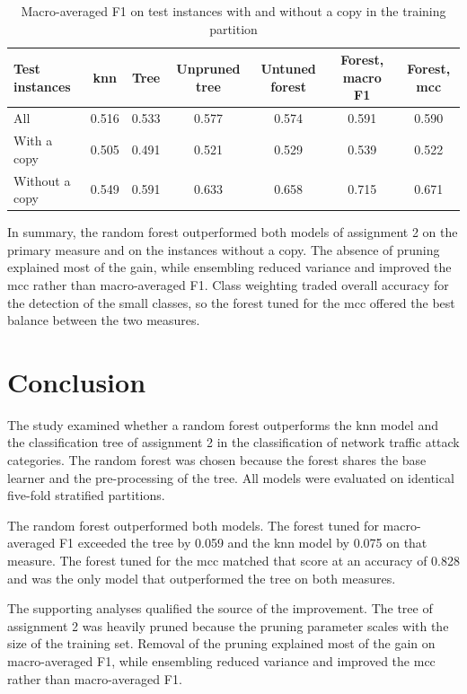 \documentclass[conference]{IEEEtran}
\begin{document}
\begin{table}[t]
\centering
\caption{Macro-averaged F1 on test instances with and without a copy in the training partition}
\label{tab:duplicates}
\small
\begin{tabular}{lcccccc}
\toprule
Test instances & \acrshort{knn} & Tree & Unpruned tree & Untuned forest & Forest, macro F1 & Forest, \acrshort{mcc} \\
\midrule
All & 0.516 & 0.533 & 0.577 & 0.574 & 0.591 & 0.590 \\
With a copy & 0.505 & 0.491 & 0.521 & 0.529 & 0.539 & 0.522 \\
Without a copy & 0.549 & 0.591 & 0.633 & 0.658 & 0.715 & 0.671 \\
\bottomrule
\end{tabular}
\end{table}

In summary, the random forest outperformed both models of assignment 2 on the
primary measure and on the instances without a copy. The
absence of pruning explained most of the gain, while ensembling reduced variance and
improved the \gls{mcc} rather than macro-averaged F1. Class weighting traded overall
accuracy for the detection of the small classes, so the forest tuned for the
\gls{mcc} offered the best balance between the two measures.

\section{Conclusion}
\glsresetall

The study examined whether a random forest outperforms the \gls{knn} model and the
classification tree of assignment 2 in the classification of network traffic attack
categories. The random forest was chosen because the forest shares the base learner
and the pre-processing of the tree. All models were evaluated on identical
five-fold stratified partitions.

The random forest outperformed both models. The forest tuned for macro-averaged F1
exceeded the tree by 0.059 and the \gls{knn} model by 0.075 on that measure. The
forest tuned for the \gls{mcc} matched that score at an accuracy of 0.828 and was the
only model that outperformed the tree on both measures.

The supporting analyses qualified the source of the improvement. The tree of
assignment 2 was heavily pruned because the pruning parameter scales with the size
of the training set. Removal of the pruning explained most of the gain on
macro-averaged F1, while ensembling reduced variance and improved the \gls{mcc}
rather than macro-averaged F1.
\end{document}
